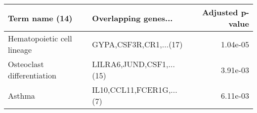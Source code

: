 \begin{tabular}{llr}
\toprule
            Term name (14) &     Overlapping genes... &  Adjusted p-value \\
\midrule
Hematopoietic cell lineage &   GYPA,CSF3R,CR1,...(17) &          1.04e-05 \\
Osteoclast differentiation & LILRA6,JUND,CSF1,...(15) &          3.91e-03 \\
                    Asthma & IL10,CCL11,FCER1G,...(7) &          6.11e-03 \\
\bottomrule
\end{tabular}

